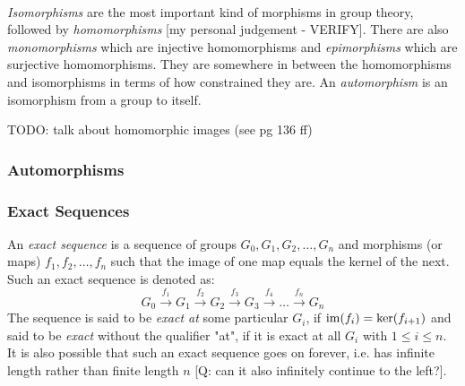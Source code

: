
\paragraph{}
\emph{Isomorphisms} are the most important kind of morphisms in group theory, followed by \emph{homomorphisms} [my personal judgement - VERIFY]. There are also \emph{monomorphisms} which are injective homomorphisms and \emph{epimorphisms} which are surjective homomorphisms. They are somewhere in between the homomorphisms and isomorphisms in terms of how constrained they are. An \emph{automorphism} is an isomorphism from a group to itself.


TODO: talk about homomorphic images (see \cite{ABoAA} pg 136 ff)

\subsubsection{Automorphisms}






\subsubsection{Exact Sequences}
An \emph{exact sequence} is a sequence of groups $G_0, G_1, G_2, \ldots, G_n$ and morphisms (or maps) $f_1, f_2, \ldots, f_n$ such that the image of one map equals the kernel of the next. Such an exact sequence is denoted as:
\begin{equation}
 G_0 \xrightarrow{f_1} G_1 
     \xrightarrow{f_2} G_2 
     \xrightarrow{f_3} G_3
     \xrightarrow{f_4} 
     \ldots
     \xrightarrow{f_n} G_n  
\end{equation}
The sequence is said to be \emph{exact at} some particular $G_i$, if $\operatorname{im}(f_i) = \ker(f_{i+1})$ and said to be \emph{exact} without the qualifier "at", if it is exact at all $G_i$ with $1 \leq i \leq n$. It is also possible that such an exact sequence goes on forever, i.e. has infinite length rather than finite length $n$ [Q: can it also infinitely continue to the left?]. 

